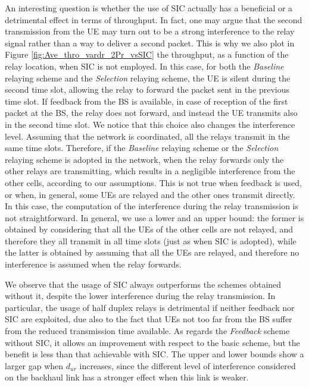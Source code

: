 \documentclass[12pt, letterpaper, onecolumn, draftcls]{IEEEtran}
\begin{document}
An interesting question is whether the use of SIC actually has a beneficial or a detrimental effect in terms of throughput. In fact, one may argue that the second transmission from the UE may turn out to be a strong interference to the relay signal rather than a way to deliver a second packet. This is why we also plot in Figure \ref{fig:Ave_thro_vardr_2Pr_vsSIC} the throughput, as a function of the relay location, when SIC is not employed.
In this case, for both the \textit{Baseline} relaying scheme and the \textit{Selection} relaying scheme, the UE is silent during the second time slot, allowing the relay to forward the packet sent in the previous time slot. If feedback from the BS is available, in case of reception of the first packet at the BS, the relay does not forward, and instead the UE transmits also in the second time slot.
We notice that this choice also changes the interference level. Assuming that the network is coordinated, all the relays transmit in the same time slots. Therefore, if the \textit{Baseline} relaying scheme or the \textit{Selection} relaying scheme is adopted in the network, when the relay forwards only the other relays are transmitting, which results in a negligible interference from the other cells, according to our assumptions.
This is not true when feedback is used, or when, in general, some UEs are relayed and the other ones transmit directly. In this case, the computation of the interference during the relay transmission is not straightforward.
In general, we use a lower and an upper bound: the former is obtained by considering that all the UEs of the other cells are not relayed, and therefore they all transmit in all time slots (just as when SIC is adopted), while the latter is obtained by assuming that all the UEs are relayed, and therefore no interference is assumed when the relay forwards.

We observe that the usage of SIC always outperforms the schemes obtained without it, despite the lower interference during the relay transmission. In particular, the usage of half duplex relays is detrimental if neither feedback nor SIC are exploited, due also to the fact that UEs not too far from the BS suffer from the reduced transmission time available.
As regards the \textit{Feedback} scheme without SIC, it allows an improvement with respect to the basic scheme, but the benefit is less than that achievable with SIC. The upper and lower bounds show a larger gap when $d_{ur}$ increases, since the different level of interference considered on the backhaul link has a stronger effect when this link is weaker.
\end{document}
